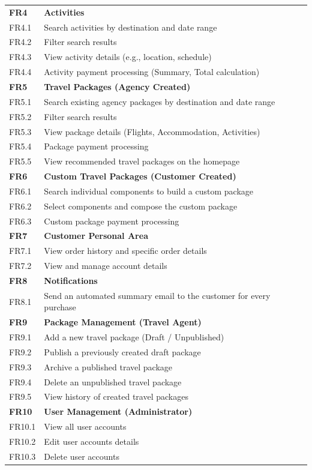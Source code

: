 \begin{longtable}{@{} p{} p{} @{}}
\midrule

\textbf{FR4} & \textbf{Activities} \\
FR4.1 & Search activities by destination and date range \\
FR4.2 & Filter search results \\
FR4.3 & View activity details (e.g., location, schedule) \\
FR4.4 & Activity payment processing (Summary, Total calculation) \\
\midrule

\textbf{FR5} & \textbf{Travel Packages (Agency Created)} \\
FR5.1 & Search existing agency packages by destination and date range \\
FR5.2 & Filter search results \\
FR5.3 & View package details (Flights, Accommodation, Activities) \\
FR5.4 & Package payment processing \\
FR5.5 & View recommended travel packages on the homepage \\
\midrule

\textbf{FR6} & \textbf{Custom Travel Packages (Customer Created)} \\
FR6.1 & Search individual components to build a custom package \\
FR6.2 & Select components and compose the custom package \\
FR6.3 & Custom package payment processing \\
\midrule

\textbf{FR7} & \textbf{Customer Personal Area} \\
FR7.1 & View order history and specific order details \\
FR7.2 & View and manage account details \\
\midrule

\textbf{FR8} & \textbf{Notifications} \\
FR8.1 & Send an automated summary email to the customer for every purchase \\
\midrule

\textbf{FR9} & \textbf{Package Management (Travel Agent)} \\
FR9.1 & Add a new travel package (Draft / Unpublished) \\
FR9.2 & Publish a previously created draft package \\
FR9.3 & Archive a published travel package \\
FR9.4 & Delete an unpublished travel package \\
FR9.5 & View history of created travel packages \\
\midrule

\textbf{FR10} & \textbf{User Management (Administrator)} \\
FR10.1 & View all user accounts \\
FR10.2 & Edit user accounts details \\
FR10.3 & Delete user accounts \\

\end{longtable}

